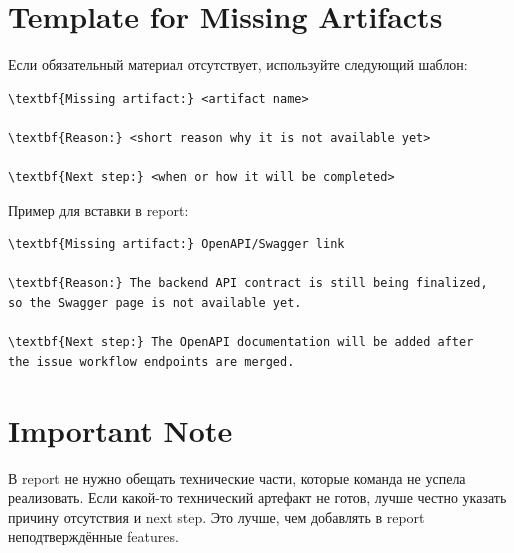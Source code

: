 \documentclass[12pt,a4paper]{article}
\begin{document}
\section{Template for Missing Artifacts}

Если обязательный материал отсутствует, используйте следующий шаблон:

\begin{verbatim}
\textbf{Missing artifact:} <artifact name>

\textbf{Reason:} <short reason why it is not available yet>

\textbf{Next step:} <when or how it will be completed>
\end{verbatim}

Пример для вставки в report:

\begin{verbatim}
\textbf{Missing artifact:} OpenAPI/Swagger link

\textbf{Reason:} The backend API contract is still being finalized,
so the Swagger page is not available yet.

\textbf{Next step:} The OpenAPI documentation will be added after
the issue workflow endpoints are merged.
\end{verbatim}

\section{Important Note}

В report не нужно обещать технические части, которые команда не успела реализовать. Если какой-то технический артефакт не готов, лучше честно указать причину отсутствия и next step. Это лучше, чем добавлять в report неподтверждённые features.
\end{document}
